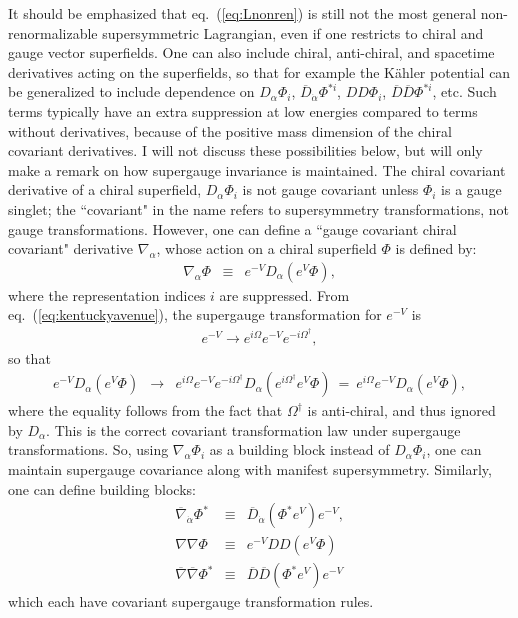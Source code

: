 \documentclass[12pt]{article}
\def\beq{\begin{eqnarray}}
\def\eeq{\end{eqnarray}}
\def\Dcon{\overline D}
\begin{document}
It should be emphasized that eq.~(\ref{eq:Lnonren}) is still not the 
most general non-renormalizable supersymmetric Lagrangian, 
even if one restricts to chiral and 
gauge vector superfields. One can also include chiral, anti-chiral, and spacetime 
derivatives acting on the superfields, so that for example the K\"ahler potential
can be generalized to include dependence on $D_\alpha \Phi_i$, 
$\Dcon_{\dot\alpha} \Phi^{*i}$, $DD\Phi_i$, $\Dcon\Dcon\Phi^{*i}$, etc. 
Such terms typically have an extra suppression at low energies 
compared to terms without derivatives,
because of the positive mass dimension of the chiral covariant derivatives.
I will not discuss these possibilities below, but will only
make a remark on how supergauge invariance is maintained. 
The chiral covariant derivative of a chiral superfield, 
$D_\alpha \Phi_i$ is not gauge covariant unless $\Phi_i$ is a gauge singlet;
the ``covariant" in the name refers to supersymmetry transformations, not gauge
transformations. However, one can define
a ``gauge covariant chiral covariant" derivative $\nabla_\alpha$, 
whose action on a chiral superfield $\Phi$ is defined by:
\beq
\nabla_\alpha \Phi &\equiv&
e^{-V} D_\alpha (e^{V} \Phi) ,
\eeq
where the representation indices $i$ are suppressed.
From eq.~(\ref{eq:kentuckyavenue}), the supergauge transformation 
for $e^{-V}$ is
\beq
e^{-V} \rightarrow e^{i \Omega} e^{-V} e^{-i \Omega^\dagger},
\eeq
so that
\beq
e^{-V} D_\alpha (e^{V} \Phi) &\rightarrow&
e^{i \Omega} e^{-V} e^{-i \Omega^\dagger} D_\alpha (e^{i \Omega^\dagger} e^{V} \Phi)
\>=\> e^{i \Omega} e^{-V} D_\alpha (e^{V} \Phi),
\eeq
where the equality follows from the fact that $\Omega^\dagger$ is anti-chiral,
and thus ignored by $D_\alpha$. This is the correct covariant transformation law
under supergauge transformations.
So, using $\nabla_\alpha \Phi_i$ 
as a building block instead of $D_\alpha \Phi_i$, one can 
maintain supergauge covariance along with manifest supersymmetry.
Similarly, one can define building blocks:
\beq
\overline\nabla_{\dot\alpha} \Phi^* &\equiv& \Dcon_{\dot\alpha} (\Phi^*e^V ) e^{-V} 
,
\\
\nabla\nabla \Phi &\equiv& e^{-V} DD (e^V \Phi)
\\
\overline\nabla\overline\nabla \Phi^* &\equiv& \Dcon\Dcon (\Phi^*e^{V} ) e^{-V} 
\eeq
which each have covariant supergauge transformation rules.
 
\end{document}
